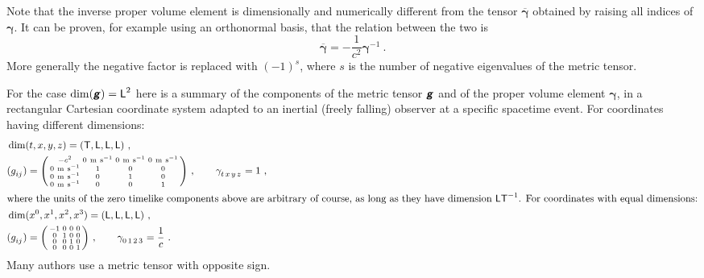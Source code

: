 \documentclass[\ifafour a4paper,12pt,\else a5paper,10pt,\fi%
onecolumn,oneside,article,%
british%
]{memoir}
\theoremstyle{remark}
\theoremstyle{innote}
\newcommand*{\mathte}[1]{\textbf{\textit{\textsf{#1}}}}
\newcommand*{\citep}{\footcites}
\DeclarePairedDelimiter\abs{\lvert}{\rvert}
\renewcommand*{\|}[1][]{\nonscript\,#1\vert\nonscript\;\mathopen{}}
\newcommand*{\chap}{ch.}%
\newcommand*{\Le}{\textsf{L}}
\newcommand*{\Ti}{\textsf{T}}
\newcommand*{\yg}{\mathte{g}}
\renewcommand*{\i}{\indices}
\newcommand*{\ye}{\bm{e}}
\newcommand*{\ygv}{\bm{\gamma}}
\newcommand*{\ygu}{\overline{\ygv}}
\begin{document}
Note that the inverse proper volume element is dimensionally and
numerically different from the tensor $\ygu$ obtained by raising all
indices of $\ygv$. It can be proven, for example using an orthonormal
basis, that the relation between the two is
\begin{equation}
  \label{eq:relation_volumes}
  \ygu = -\frac{1}{c^{2}} \ygv^{-1} \ .
\end{equation}
More generally the negative factor is replaced with $(-1)^{s}$, where $s$ is
the number of negative eigenvalues of the metric tensor.

\medskip



For the case $\dim(\yg)=\Le^{2}$ here is a summary of the components of the
metric tensor $\yg$ and of the proper volume element $\ygv$, in a
rectangular Cartesian coordinate system adapted to an inertial (freely
falling) observer at a specific spacetime event. For coordinates having
different dimensions:
\begin{align}
  \label{eq:inertial_components_dimcase}
  &\begin{aligned}
    &\dim(t,x,y,z) = (\Ti,\Le,\Le,\Le) \ ,
    \\
  &(g\i{_{ij}}) =
  \begin{psmallmatrix}
    -c^{2} &0\ \mathrm{m\ s^{-1}}&0\ \mathrm{m\ s^{-1}}&0\ \mathrm{m\ s^{-1}}\\
    0\ \mathrm{m\ s^{-1}}& 1 & 0 & 0\\
    0\ \mathrm{m\ s^{-1}}& 0 & 1 & 0\\
    0\ \mathrm{m\ s^{-1}}& 0 & 0 & 1
  \end{psmallmatrix} \ ,
  \qquad
  \gamma\i{_{t\,x\,y\,z}} = 1 \ ,
  \end{aligned}
  \\
  \intertext{where the units of the zero timelike components above are arbitrary of  course, as long as they have dimension $\Le\Ti^{-1}$. For coordinates with equal dimensions:}
\label{eq:inertial_components_Lcase}
  &\begin{aligned}
    &\dim(x^{0}, x^{1}, x^{2}, x^{3}) = (\Le,\Le,\Le,\Le) \ ,
    \\
  &(g\i{_{ij}}) =
  \begin{psmallmatrix}
    -1 &0&0&0\\
    0& 1 & 0 & 0\\
    0& 0 & 1 & 0\\
    0& 0 & 0 & 1
  \end{psmallmatrix} \ ,
  \qquad
  \gamma\i{_{0\,1\,2\,3}} = \frac{1}{c} \ .
\end{aligned}
\end{align}
Many authors use a metric tensor with opposite sign.
\end{document}
